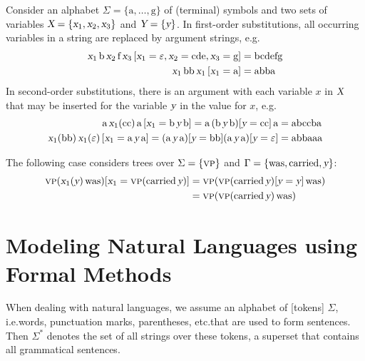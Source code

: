 \documentclass[../document.tex]{subfiles}
\begin{document}
    \begin{example}[Substitution]
        Consider an alphabet \(\Sigma = \{\text{a}, \ldots, \text{g}\}\) of (terminal) symbols and two sets of variables \(\textsl{X} = \{\textsl{x}_1, \textsl{x}_2, \textsl{x}_3\}\) and \(\textsl{Y} = \{\textsl{y}\}\).
        In first-order substitutions, all occurring variables in a string are replaced by argument strings, e.g.
        \begin{align*}
            \textsl{x}_1 \, \text{b} \, \textsl{x}_2 \, \text{f} \, \textsl{x}_3\,[\textsl{x}_1=\varepsilon, \textsl{x}_2=\text{cde}, \textsl{x}_3=\text{g}] &= \text{bcdefg} \\
            \textsl{x}_1 \, \text{bb} \, \textsl{x}_1 \, [\textsl{x}_1=\text{a}] &= \text{abba}
        \end{align*}
        In second-order substitutions, there is an argument with each variable \(x\) in \(\textsl{X}\) that may be inserted for the variable \(\textsl{y}\) in the value for \(x\), e.g.
        \begin{align*}
            \text{a} \, \textsl{x}_1(\text{cc}) \, \text{a} \, [\textsl{x}_1=\text{b}\,\textsl{y}\,\text{b}] = \text{a} \, (\text{b}\,\textsl{y}\,\text{b})[\textsl{y}=\text{cc}] \, \text{a} &= \text{abccba} \\
            \textsl{x}_1(\text{bb}) \, \textsl{x}_1(\varepsilon) \, [\textsl{x}_1=\text{a}\,\textsl{y}\,\text{a}] = (\text{a}\,\textsl{y}\,\text{a})[\textsl{y}=\text{bb}] (\text{a}\,\textsl{y}\,\text{a})[\textsl{y}=\varepsilon] &= \text{abbaaa}
        \end{align*}

        The following case considers trees over \(\Sigma=\{\textsc{vp}\}\) and \(\Gamma=\{\text{was}, \text{carried}, \textsl{y}\}\):
        \begin{align*}
            \textsc{vp}( \textsl{x}_1(\textsl{y}) \, \text{was} )[\textsl{x}_1=\textsc{vp}(\text{carried}\,\textsl{y})]
                &= \textsc{vp}( \textsc{vp}(\text{carried}\,\textsl{y})[\textsl{y}=\textsl{y}] \, \text{was} ) \\
                &= \textsc{vp}(\textsc{vp}(\text{carried}\,\textsl{y})\,\text{was})
        \end{align*}
    \end{example}

    \section{Modeling Natural Languages using Formal Methods}\label{sec:preliminaries:ctrees}
    When dealing with natural languages, we assume an alphabet of [tokens] \(\Sigma\), i.e.\@ words, punctuation marks, parentheses, etc.\@ that are used to form sentences.
    Then \(\Sigma^*\) denotes the set of all strings over these tokens, a superset that contains all grammatical sentences.
\end{document}

